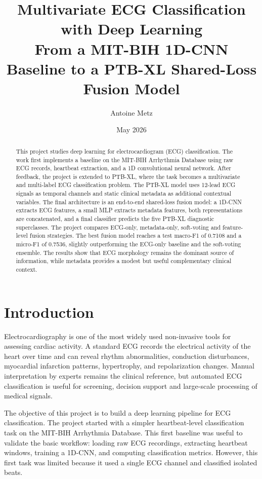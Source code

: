 \documentclass[11pt,a4paper]{article}
\title{\textbf{Multivariate ECG Classification with Deep Learning}\\
\large From a MIT-BIH 1D-CNN Baseline to a PTB-XL Shared-Loss Fusion Model}
\author{Antoine Metz}
\date{May 2026}
\begin{document}
\maketitle

\begin{abstract}
This project studies deep learning for electrocardiogram (ECG) classification. The work first implements a baseline on the MIT-BIH Arrhythmia Database using raw ECG records, heartbeat extraction, and a 1D convolutional neural network. After feedback, the project is extended to PTB-XL, where the task becomes a multivariate and multi-label ECG classification problem. The PTB-XL model uses 12-lead ECG signals as temporal channels and static clinical metadata as additional contextual variables. The final architecture is an end-to-end shared-loss fusion model: a 1D-CNN extracts ECG features, a small MLP extracts metadata features, both representations are concatenated, and a final classifier predicts the five PTB-XL diagnostic superclasses. The project compares ECG-only, metadata-only, soft-voting and feature-level fusion strategies. The best fusion model reaches a test macro-F1 of 0.7108 and a micro-F1 of 0.7536, slightly outperforming the ECG-only baseline and the soft-voting ensemble. The results show that ECG morphology remains the dominant source of information, while metadata provides a modest but useful complementary clinical context.
\end{abstract}

\tableofcontents
\newpage

\section{Introduction}

Electrocardiography is one of the most widely used non-invasive tools for assessing cardiac activity. A standard ECG records the electrical activity of the heart over time and can reveal rhythm abnormalities, conduction disturbances, myocardial infarction patterns, hypertrophy, and repolarization changes. Manual interpretation by experts remains the clinical reference, but automated ECG classification is useful for screening, decision support and large-scale processing of medical signals.

The objective of this project is to build a deep learning pipeline for ECG classification. The project started with a simpler heartbeat-level classification task on the MIT-BIH Arrhythmia Database. This first baseline was useful to validate the basic workflow: loading raw ECG recordings, extracting heartbeat windows, training a 1D-CNN, and computing classification metrics. However, this first task was limited because it used a single ECG channel and classified isolated beats.
\end{document}
